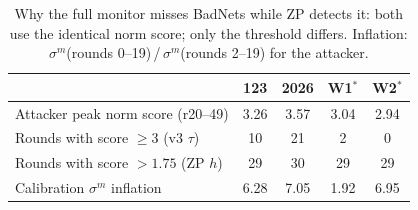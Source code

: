 \begin{table}[t]
\centering\footnotesize
\setlength{\tabcolsep}{3.5pt}
\caption{Why the full monitor misses BadNets while ZP detects it: both use the identical norm score; only the threshold differs. Inflation: $\sigma^m$(rounds 0--19)\,/\,$\sigma^m$(rounds 2--19) for the attacker.}
\label{tab:calibration}
\begin{tabular}{@{}lcccc@{}}
\toprule
 & 123 & 2026 & W1$^\ast$ & W2$^\ast$ \\
\midrule
Attacker peak norm score (r20--49) & 3.26 & 3.57 & 3.04 & 2.94 \\
Rounds with score $\geq 3$ (v3 $\tau$) & 10 & 21 & 2 & 0 \\
Rounds with score $> 1.75$ (ZP $h$) & 29 & 30 & 29 & 29 \\
Calibration $\sigma^m$ inflation & 6.28 & 7.05 & 1.92 & 6.95 \\
\bottomrule
\end{tabular}
\end{table}
